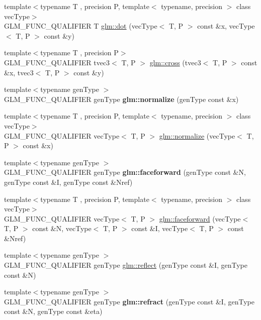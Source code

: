 \begin{DoxyCompactItemize}
\item 
{\footnotesize template$<$typename T , precision P, template$<$ typename, precision $>$ class vec\-Type$>$ }\\G\-L\-M\-\_\-\-F\-U\-N\-C\-\_\-\-Q\-U\-A\-L\-I\-F\-I\-E\-R T \hyperlink{group__core__func__geometric_ga7dada304da2ba7dd3376ab4f178c3f6b}{glm\-::dot} (vec\-Type$<$ T, P $>$ const \&x, vec\-Type$<$ T, P $>$ const \&y)
\item 
{\footnotesize template$<$typename T , precision P$>$ }\\G\-L\-M\-\_\-\-F\-U\-N\-C\-\_\-\-Q\-U\-A\-L\-I\-F\-I\-E\-R tvec3$<$ T, P $>$ \hyperlink{group__core__func__geometric_gafe2cae8cb26fd44be62aee97369d0af8}{glm\-::cross} (tvec3$<$ T, P $>$ const \&x, tvec3$<$ T, P $>$ const \&y)
\item 
\hypertarget{namespaceglm_a213a489b64d438c533ea56f4cb2d2426}{{\footnotesize template$<$typename gen\-Type $>$ }\\G\-L\-M\-\_\-\-F\-U\-N\-C\-\_\-\-Q\-U\-A\-L\-I\-F\-I\-E\-R gen\-Type {\bfseries glm\-::normalize} (gen\-Type const \&x)}\label{namespaceglm_a213a489b64d438c533ea56f4cb2d2426}

\item 
{\footnotesize template$<$typename T , precision P, template$<$ typename, precision $>$ class vec\-Type$>$ }\\G\-L\-M\-\_\-\-F\-U\-N\-C\-\_\-\-Q\-U\-A\-L\-I\-F\-I\-E\-R vec\-Type$<$ T, P $>$ \hyperlink{group__core__func__geometric_gada9451ec170a36fe53552812b9c03a68}{glm\-::normalize} (vec\-Type$<$ T, P $>$ const \&x)
\item 
\hypertarget{namespaceglm_ad32c7f0f9f0ca45467adbb4a1db5184d}{{\footnotesize template$<$typename gen\-Type $>$ }\\G\-L\-M\-\_\-\-F\-U\-N\-C\-\_\-\-Q\-U\-A\-L\-I\-F\-I\-E\-R gen\-Type {\bfseries glm\-::faceforward} (gen\-Type const \&N, gen\-Type const \&I, gen\-Type const \&Nref)}\label{namespaceglm_ad32c7f0f9f0ca45467adbb4a1db5184d}

\item 
{\footnotesize template$<$typename T , precision P, template$<$ typename, precision $>$ class vec\-Type$>$ }\\G\-L\-M\-\_\-\-F\-U\-N\-C\-\_\-\-Q\-U\-A\-L\-I\-F\-I\-E\-R vec\-Type$<$ T, P $>$ \hyperlink{group__core__func__geometric_gaea854e5aec1b5839832ac2dfc7cd3c0d}{glm\-::faceforward} (vec\-Type$<$ T, P $>$ const \&N, vec\-Type$<$ T, P $>$ const \&I, vec\-Type$<$ T, P $>$ const \&Nref)
\item 
{\footnotesize template$<$typename gen\-Type $>$ }\\G\-L\-M\-\_\-\-F\-U\-N\-C\-\_\-\-Q\-U\-A\-L\-I\-F\-I\-E\-R gen\-Type \hyperlink{group__core__func__geometric_gab63646fc36b81cf69d3ce123a72f76f2}{glm\-::reflect} (gen\-Type const \&I, gen\-Type const \&N)
\item 
\hypertarget{namespaceglm_a9aa448ae8257316d0bd2a7ba6e9f201d}{{\footnotesize template$<$typename gen\-Type $>$ }\\G\-L\-M\-\_\-\-F\-U\-N\-C\-\_\-\-Q\-U\-A\-L\-I\-F\-I\-E\-R gen\-Type {\bfseries glm\-::refract} (gen\-Type const \&I, gen\-Type const \&N, gen\-Type const \&eta)}\label{namespaceglm_a9aa448ae8257316d0bd2a7ba6e9f201d}


\end{DoxyCompactItemize}
